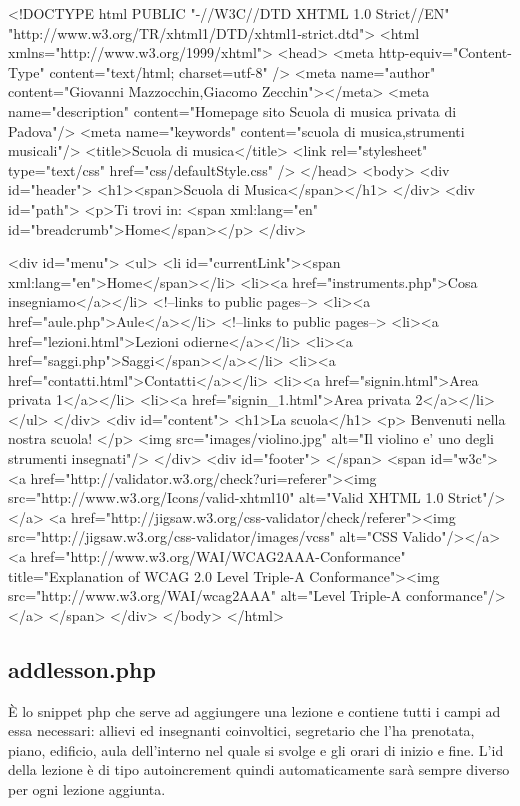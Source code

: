 \documentclass{article}
\begin{document}
\begin{html}
<!DOCTYPE html PUBLIC "-//W3C//DTD XHTML 1.0 Strict//EN" "http://www.w3.org/TR/xhtml1/DTD/xhtml1-strict.dtd">
<html xmlns="http://www.w3.org/1999/xhtml">
	<head>
		<meta http-equiv="Content-Type" content="text/html; charset=utf-8" />
		<meta name="author" content="Giovanni Mazzocchin,Giacomo Zecchin"></meta>
		<meta name="description" content="Homepage sito Scuola di musica privata di Padova"/>
		<meta name="keywords" content="scuola di musica,strumenti musicali"/>
		<title>Scuola di musica</title>
		<link rel="stylesheet" type="text/css" href="css/defaultStyle.css" />
	</head>
	<body>
		<div id="header">
			<h1><span>Scuola di Musica</span></h1>
			</div>
			<div id="path">
				<p>Ti trovi in: <span xml:lang="en" id="breadcrumb">Home</span></p>
			</div>

		<div id="menu">
			<ul>
				<li id="currentLink"><span xml:lang="en">Home</span></li>
				<li><a href="instruments.php">Cosa insegniamo</a></li>     <!--links to public pages-->
				<li><a href="aule.php">Aule</a></li>     <!--links to public pages-->
				<li><a href="lezioni.html">Lezioni odierne</a></li>
				<li><a href="saggi.php">Saggi</span></a></li>
				<li><a href="contatti.html">Contatti</a></li>
				<li><a href="signin.html">Area privata 1</a></li>
				<li><a href="signin_1.html">Area privata 2</a></li>
			</ul>
		</div>
		<div id="content">
			<h1>La scuola</h1>
			<p> Benvenuti nella nostra scuola!
			</p>
			<img src="images/violino.jpg" alt="Il violino e' uno degli strumenti insegnati"/>
		</div>
		<div id="footer">
			</span>
			<span id="w3c">
				<a href="http://validator.w3.org/check?uri=referer"><img src="http://www.w3.org/Icons/valid-xhtml10" alt="Valid XHTML 1.0 Strict"/></a>
				<a href="http://jigsaw.w3.org/css-validator/check/referer"><img src="http://jigsaw.w3.org/css-validator/images/vcss" alt="CSS Valido"/></a>
    			<a href="http://www.w3.org/WAI/WCAG2AAA-Conformance" title="Explanation of WCAG 2.0 Level Triple-A Conformance"><img src="http://www.w3.org/WAI/wcag2AAA" alt="Level Triple-A conformance"/></a>
			</span>
		</div>
	</body>
</html>
\end{html}

\bigskip


\subsection{add\textunderscore lesson.php}

È lo snippet php che serve ad aggiungere una lezione e contiene tutti i campi ad essa necessari: allievi ed insegnanti coinvoltici, segretario che l'ha prenotata, piano, edificio, aula dell'interno nel quale si svolge e gli orari di inizio e fine. L'id della lezione è di tipo auto\textunderscore increment quindi automaticamente sarà sempre diverso per ogni lezione aggiunta.
\end{document}
